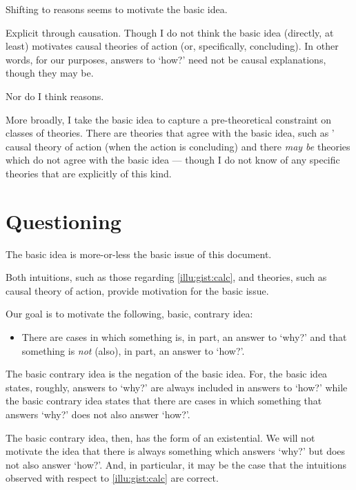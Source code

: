 \begin{note}
  Shifting to reasons seems to motivate the basic idea.

  Explicit through causation.
  Though I do not think the basic idea (directly, at least) motivates causal theories of action (or, specifically, concluding).
  In other words, for our purposes, answers to `how?' need not be causal explanations, though they may be.

  Nor do I think reasons.

  More broadly, I take the basic idea to capture a pre-theoretical constraint on classes of theories.
  There are theories that agree with the basic idea, such as \citeauthor{Davidson:1963aa}' causal theory of action (when the action is concluding) and there \emph{may be} theories which do not agree with the basic idea --- though I do not know of any specific theories that are explicitly of this kind.
\end{note}

\section*{Questioning \issueInclusion{}}

\begin{note}
  The basic idea is more-or-less the basic issue of this document.

  Both intuitions, such as those regarding \autoref{illu:gist:calc}, and theories, such as \citeauthor{Davidson:1963aa} causal theory of action, provide motivation for the basic issue.

  Our goal is to motivate the following, basic, contrary idea:

  \begin{itemize}
  \item
    There are cases in which something is, in part, an answer to `why?' and that something is \emph{not} (also), in part, an answer to `how?'.
  \end{itemize}

  The basic contrary idea is the negation of the basic idea.
  For, the basic idea states, roughly, answers to `why?' are always included in answers to `how?' while the basic contrary idea states that there are cases in which something that answers `why?' does not also answer `how?'.

  The basic contrary idea, then, has the form of an existential.
  We will not motivate the idea that there is always something which answers `why?' but does not also answer `how?'.
  And, in particular, it may be the case that the intuitions observed with respect to \autoref{illu:gist:calc} are correct.
\end{note}

